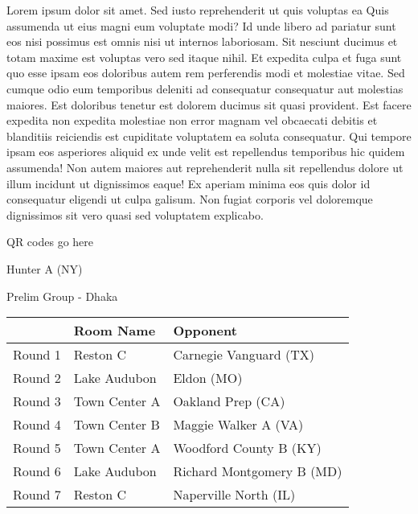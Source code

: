 \documentclass{article}%
\begin{document}
\vspace*{8pt}%
\linebreak%
\newline%
\newline%
Lorem ipsum dolor sit amet. Sed iusto reprehenderit ut quis voluptas ea Quis assumenda ut eius magni eum voluptate modi? Id unde libero ad pariatur sunt eos nisi possimus est omnis nisi ut internos laboriosam. Sit nesciunt ducimus et totam maxime est voluptas vero sed itaque nihil. Et expedita culpa et fuga sunt quo esse ipsam eos doloribus autem rem perferendis modi et molestiae vitae.\newline%
\newline%
Sed cumque odio eum temporibus deleniti ad consequatur consequatur aut molestias maiores. Est doloribus tenetur est dolorem ducimus sit quasi provident. Est facere expedita non expedita molestiae non error magnam vel obcaecati debitis et blanditiis reiciendis est cupiditate voluptatem ea soluta consequatur. Qui tempore ipsam eos asperiores aliquid ex unde velit est repellendus temporibus hic quidem assumenda!\newline%
\newline%
Non autem maiores aut reprehenderit nulla sit repellendus dolore ut illum incidunt ut dignissimos eaque! Ex aperiam minima eos quis dolor id consequatur eligendi ut culpa galisum. Non fugiat corporis vel doloremque dignissimos sit vero quasi sed voluptatem explicabo.\newline%
\newline%
%
\vspace*{30pt}%
\begin{center}%
\begin{Huge}%
QR codes go here%
\end{Huge}%
\end{center}%
\newpage%
%
\begin{center}%
\begin{Huge}%
Hunter A (NY)%
\end{Huge}%
\vspace*{8pt}%
\linebreak%
\begin{Large}%
Prelim Group {-} Dhaka%
\end{Large}%
\end{center}%
\begin{tabularx}{\textwidth}{|c|Y|Y|}%
\hline%
&Room Name&Opponent\\%
\hline%
Round 1&Reston C&Carnegie Vanguard (TX)\\%
Round 2&Lake Audubon&Eldon (MO)\\%
Round 3&Town Center A&Oakland Prep (CA)\\%
Round 4&Town Center B&Maggie Walker A (VA)\\%
Round 5&Town Center A&Woodford County B (KY)\\%
Round 6&Lake Audubon&Richard Montgomery B (MD)\\%
Round 7&Reston C&Naperville North (IL)\\%
\hline%
\end{tabularx}%
\end{document}
